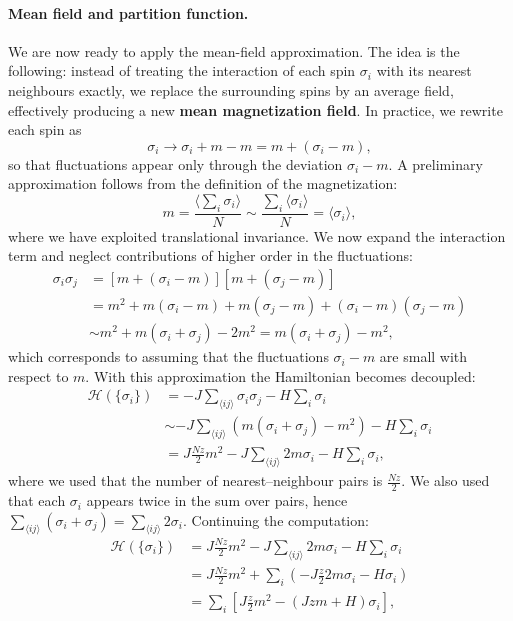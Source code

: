 \paragraph{Mean field and partition function.}
We are now ready to apply the mean-field approximation. The idea is the following: instead of treating the interaction of each spin \(\sigma_i\) with its nearest neighbours exactly, we replace the surrounding spins by an average field, effectively producing a new \textbf{mean magnetization field}. In practice, we rewrite each spin as
\[
    \sigma_i \to \sigma_i + m - m = m + (\sigma_i - m),
\]
so that fluctuations appear only through the deviation \(\sigma_i - m\).
A preliminary approximation follows from the definition of the magnetization:
\[
    m = \frac{\langle \sum_{i} \sigma_i \rangle}{N}
    \sim \frac{\sum_{i} \langle \sigma_i \rangle}{N}
    = \langle \sigma_i \rangle,
\]
where we have exploited translational invariance.
We now expand the interaction term and neglect contributions of higher order in the fluctuations:
\[
    \begin{aligned}
        \sigma_i \sigma_j
         & = [m + (\sigma_i - m)][m + (\sigma_j - m)]                               \\
         & = m^2 + m(\sigma_i - m) + m(\sigma_j - m) + (\sigma_i - m)(\sigma_j - m) \\
         & \sim m^2 + m(\sigma_i + \sigma_j) - 2m^2
        = m(\sigma_i + \sigma_j) - m^2,
    \end{aligned}
\]
which corresponds to assuming that the fluctuations \(\sigma_i - m\) are small with respect to \(m\).
With this approximation the Hamiltonian becomes decoupled:
\[
    \begin{aligned}
        \mathcal{H}(\{\sigma_i\})
         & = -J \sum_{\langle ij \rangle} \sigma_i \sigma_j - H \sum_{i} \sigma_i               \\
         & \sim -J \sum_{\langle ij \rangle} (m(\sigma_i + \sigma_j)-m^2) - H \sum_{i} \sigma_i \\
         & = J \frac{Nz}{2} m^2 -J\sum_{\langle ij \rangle} 2m\sigma_i - H \sum_{i} \sigma_i,
    \end{aligned}
\]
where we used that the number of nearest--neighbour pairs is \(\frac{Nz}{2}\).
We also used that each \(\sigma_i\) appears twice in the sum over pairs, hence
\(\sum_{\langle ij \rangle} (\sigma_i + \sigma_j) = \sum_{\langle ij \rangle} 2\sigma_i\).
Continuing the computation:
\[
    \begin{aligned}
        \mathcal{H}(\{\sigma_i\})
         & = J \frac{Nz}{2} m^2 -J\sum_{\langle ij \rangle} 2m\sigma_i - H \sum_{i} \sigma_i \\
         & = J \frac{Nz}{2} m^2
        + \sum_{i} \left( -J \frac{z}{2} 2m \sigma_i -H \sigma_i\right)                      \\
         & =  \sum_{i} \left[ J \frac{z}{2} m^2 - \left( Jzm + H \right)\sigma_i \right],
    \end{aligned}
\]
